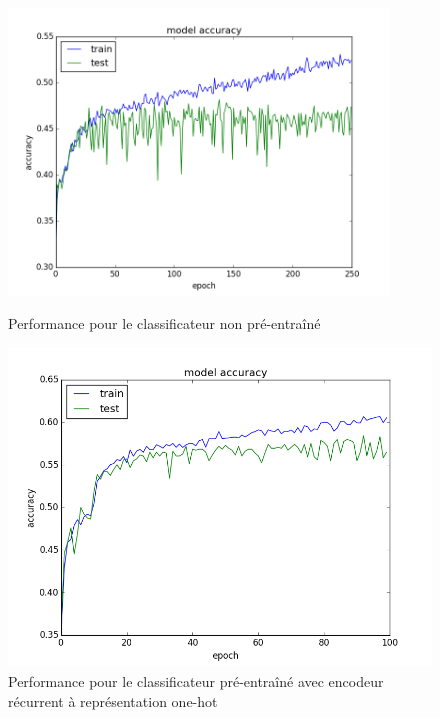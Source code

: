 \documentclass[a4paper, 11pt, onecolumn]{article}
\begin{document}
\begin{figure}[!tbp]
\centering  
  \begin{minipage}[b]{0.3\textwidth}
    \includegraphics[width=0.9\textwidth]{SupClass}
    \caption{Performance pour le classificateur non pré-entraîné}
  \end{minipage}
  \hfill
  \begin{minipage}[b]{0.3\textwidth}
    \includegraphics[width=\textwidth]{SpeClass}
    \caption{Performance pour le classificateur pré-entraîné avec encodeur
      récurrent à représentation one-hot}
  \end{minipage}
  \hfill
  \begin{minipage}[b]{0.3\textwidth}

\end{minipage}
\end{figure}
\end{document}
